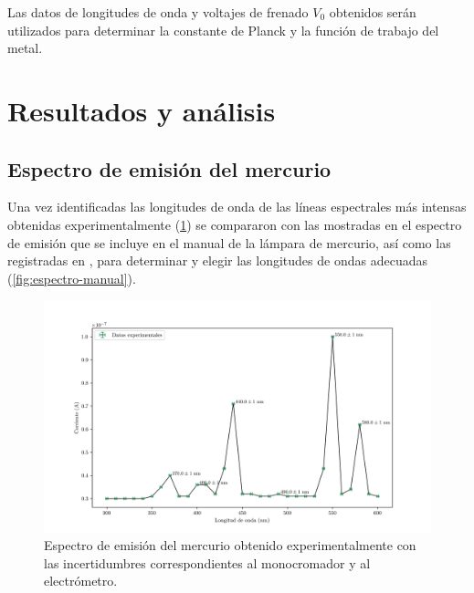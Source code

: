 \documentclass[12pt]{IEEEtran}
\begin{document}
Las datos de longitudes de onda y voltajes de frenado \(V_{0}\) obtenidos serán utilizados para determinar la constante de Planck y la función de trabajo del metal.

\section{Resultados y análisis}

\subsection{Espectro de emisión del mercurio}

Una vez identificadas las longitudes de onda de las líneas espectrales más intensas obtenidas experimentalmente (\cref{fig:espectro-exp}) se compararon con las mostradas en el espectro de emisión que se incluye en el manual de la lámpara de mercurio, así como las registradas en \cite{MercurySpectra}, para determinar y elegir las longitudes de ondas adecuadas (\cref{fig:espectro-manual}). \\

\begin{figure}[htp]
    \centering
    \includegraphics[width=\linewidth]{espectro-mercurio}
    \caption{Espectro de emisión del mercurio obtenido experimentalmente con las incertidumbres correspondientes al monocromador y al electrómetro.}
    \label{fig:espectro-exp}
\end{figure}
\end{document}
